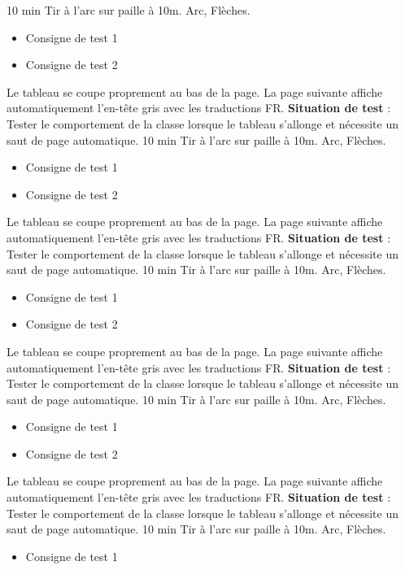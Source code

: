 \documentclass{../tex/ficheseance}
\begin{document}
\begin{tableauSeance}
		{10 min}
		{Tir à l'arc sur paille à 10m.}
		{Arc, Flèches.}
		{\begin{itemize}
			\item Consigne de test 1
			\item Consigne de test 2
		\end{itemize}}
		{Le tableau se coupe proprement au bas de la page.}
		{La page suivante affiche automatiquement l'en-tête gris avec les traductions FR.}		
		\ligneSeance
		{\textbf{Situation de test} : Tester le comportement de la classe lorsque le tableau s'allonge et nécessite un saut de page automatique.}
		{10 min}
		{Tir à l'arc sur paille à 10m.}
		{Arc, Flèches.}
		{\begin{itemize}
			\item Consigne de test 1
			\item Consigne de test 2
		\end{itemize}}
		{Le tableau se coupe proprement au bas de la page.}
		{La page suivante affiche automatiquement l'en-tête gris avec les traductions FR.}		
		\ligneSeance
		{\textbf{Situation de test} : Tester le comportement de la classe lorsque le tableau s'allonge et nécessite un saut de page automatique.}
		{10 min}
		{Tir à l'arc sur paille à 10m.}
		{Arc, Flèches.}
		{\begin{itemize}
			\item Consigne de test 1
			\item Consigne de test 2
		\end{itemize}}
		{Le tableau se coupe proprement au bas de la page.}
		{La page suivante affiche automatiquement l'en-tête gris avec les traductions FR.}		
		\ligneSeance
		{\textbf{Situation de test} : Tester le comportement de la classe lorsque le tableau s'allonge et nécessite un saut de page automatique.}
		{10 min}
		{Tir à l'arc sur paille à 10m.}
		{Arc, Flèches.}
		{\begin{itemize}
			\item Consigne de test 1
			\item Consigne de test 2
		\end{itemize}}
		{Le tableau se coupe proprement au bas de la page.}
		{La page suivante affiche automatiquement l'en-tête gris avec les traductions FR.}		
		\ligneSeance
		{\textbf{Situation de test} : Tester le comportement de la classe lorsque le tableau s'allonge et nécessite un saut de page automatique.}
		{10 min}
		{Tir à l'arc sur paille à 10m.}
		{Arc, Flèches.}
		{\begin{itemize}
			\item Consigne de test 1

\end{itemize}}
\end{tableauSeance}
\end{document}
